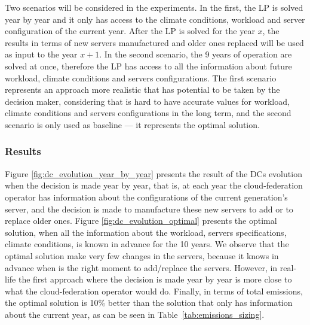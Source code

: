 Two scenarios will be considered in the experiments. In the first, the LP is solved year by year and it only has access to the climate conditions, workload and server configuration of the current year. After the LP is solved for the year $x$, the results in terms of new servers manufactured and older ones replaced will be used as input to the year $x +1$. In the second scenario, the 9 years of operation are solved at once, therefore the LP has access to all the information about future workload, climate conditions and servers configurations. The first scenario represents an approach more realistic that has potential to be taken by the decision maker, considering that is hard to have accurate values for workload, climate conditions and servers configurations in the long term, and the second scenario is only used as baseline --- it represents the optimal solution.

\subsubsection{Results}

Figure \ref{fig:dc_evolution_year_by_year} presents the result of the DCs evolution when the decision is made year by year, that is, at each year the cloud-federation operator has information about the configurations of the current generation's server, and the decision is made to manufacture these new servers to add or to replace older ones. Figure \ref{fig:dc_evolution_optimal} presents the optimal solution, when all the information about the workload, servers specifications, climate conditions, is known in advance for the 10 years. We observe that the optimal solution make very few changes in the servers, because it knows in advance when is the right moment to add/replace the servers. However, in real-life the first approach where the decision is made year by year is more close to what the cloud-federation operator would do. Finally, in terms of total  emissions, the optimal solution is 10\% better than the solution that only has information about the current year, as can be seen in Table~\ref{tab:emissions_sizing}.

